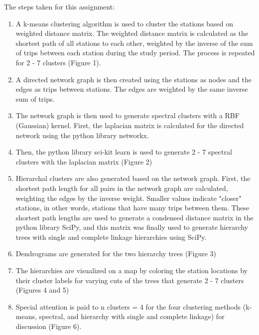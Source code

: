 \documentclass[10pt,twocolumn]{article}
\begin{document}
The steps taken for this assignment:

\begin{enumerate}
\item A k-means clustering algorithm is used to cluster the stations based on
weighted distance matrix. The weighted distance matrix is calculated as the
shortest path of all stations to each other, weighted by the inverse of the
sum of trips between each station during the study period. The process
is repeated for 2 - 7 clusters (Figure 1).
\item A directed network graph is then created using the stations as nodes and the edges as trips
between stations. The edges are weighted by the same inverse sum of trips.
\item The network graph is then used to generate spectral clusters with a RBF (Gaussian)
kernel. First, the
laplacian matrix is calculated for the directed network using the python library networkx.
\item Then, the python library sci-kit learn is used to generate 2 - 7 spectral
clusters with the laplacian matrix (Figure 2)
\item Hierarchal clusters are also generated based on the network graph. First,
the shortest path length for all pairs in the network graph are calculated, weighting
the edges by the inverse weight. Smaller values indicate "closer" stations, in other words,
stations that have many trips between them.
These shortest path lengths are used to generate a condensed distance matrix in the
python library SciPy, and this matrix was finally used to generate hierarchy trees
with single and complete
linkage hierarchies using SciPy.
\item  Dendrograms are generated for the two hierarchy trees (Figure 3)
\item The hierarchies are visualized on a map by coloring the station locations by their
cluster labels for varying cuts of the trees that generate 2 - 7 clusters (Figures 4 and 5)
\item Special attention is paid to n clusters = 4 for the four clustering methods
(k-means, spectral, and hierarchy with single and complete linkage)
for discussion (Figure 6).
\end{enumerate}
\end{document}
